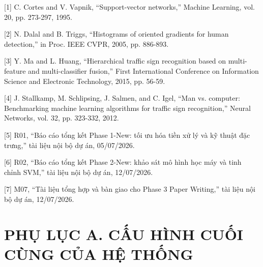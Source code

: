 \documentclass[12pt,a4paper]{article}
\begin{document}
{[}1{]} C. Cortes and V. Vapnik, ``Support-vector networks,'' Machine
Learning, vol. 20, pp. 273-297, 1995.

{[}2{]} N. Dalal and B. Triggs, ``Histograms of oriented gradients for
human detection,'' in Proc. IEEE CVPR, 2005, pp. 886-893.

{[}3{]} Y. Ma and L. Huang, ``Hierarchical traffic sign recognition
based on multi-feature and multi-classifier fusion,'' First
International Conference on Information Science and Electronic
Technology, 2015, pp. 56-59.

{[}4{]} J. Stallkamp, M. Schlipsing, J. Salmen, and C. Igel, ``Man vs.
computer: Benchmarking machine learning algorithms for traffic sign
recognition,'' Neural Networks, vol. 32, pp. 323-332, 2012.

{[}5{]} R01, ``Báo cáo tổng kết Phase 1-New: tối ưu hóa tiền xử lý và kỹ
thuật đặc trưng,'' tài liệu nội bộ dự án, 05/07/2026.

{[}6{]} R02, ``Báo cáo tổng kết Phase 2-New: khảo sát mô hình học máy và
tinh chỉnh SVM,'' tài liệu nội bộ dự án, 12/07/2026.

{[}7{]} M07, ``Tài liệu tổng hợp và bàn giao cho Phase 3 Paper
Writing,'' tài liệu nội bộ dự án, 12/07/2026.

\section{PHỤ LỤC A. CẤU HÌNH CUỐI CÙNG CỦA HỆ
THỐNG}\label{phux1ee5-lux1ee5c-a.-cux1ea5u-huxecnh-cuux1ed1i-cuxf9ng-cux1ee7a-hux1ec7-thux1ed1ng}
\end{document}
